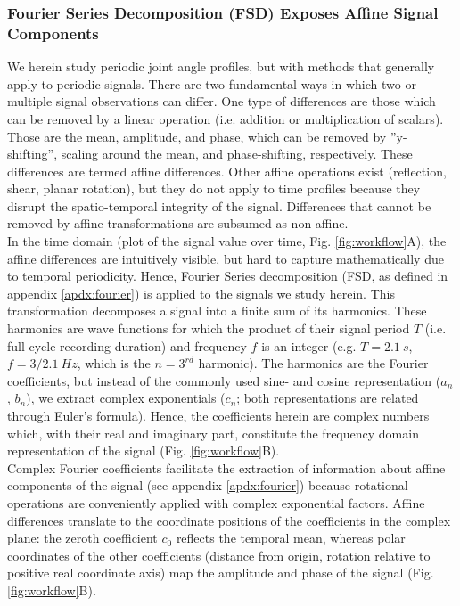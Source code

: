 \subsubsection{Fourier Series Decomposition (FSD) Exposes Affine Signal Components}
We herein study periodic joint angle profiles, but with methods that generally apply to periodic signals.
There are two fundamental ways in which two or multiple signal observations can differ.
One type of differences are those which can be removed by a linear operation (i.e. addition or multiplication of scalars).
Those are the mean, amplitude, and phase, which can be removed by ''y-shifting'', scaling around the mean, and phase-shifting, respectively.
These differences are termed affine differences.
Other affine operations exist (reflection, shear, planar rotation), but they do not apply to time profiles because they disrupt the spatio-temporal integrity of the signal.
Differences that cannot be removed by affine transformations are subsumed as non-affine.
\\In the time domain (plot of the signal value over time, Fig. \ref{fig:workflow}A), the affine differences are intuitively visible, but hard to capture mathematically due to temporal periodicity.
Hence, Fourier Series decomposition (FSD, as defined in appendix \ref*{apdx:fourier}) is applied to the signals we study herein.
This transformation decomposes a signal into a finite sum of its harmonics.
These harmonics are wave functions for which the product of their signal period $T$ (i.e. full cycle recording duration) and frequency $f$ is an integer (e.g. $T = 2.1\ s$, $f = 3/2.1\ Hz$, which is the $n=3^{rd}$ harmonic).
The harmonics are the Fourier coefficients, but instead of the commonly used sine- and cosine representation ($a_{n}$, $b_{n}$), we extract complex exponentials ($c_{n}$; both representations are related through Euler's formula).
Hence, the coefficients herein are complex numbers which, with their real and imaginary part, constitute the frequency domain representation of the signal (Fig. \ref{fig:workflow}B).
\\Complex Fourier coefficients facilitate the extraction of information about affine components of the signal (see appendix \ref*{apdx:fourier}) because rotational operations are conveniently applied with complex exponential factors.
Affine differences translate to the coordinate positions of the coefficients in the complex plane: the zeroth coefficient $c_{0}$ reflects the temporal mean, whereas polar coordinates of the other coefficients  (distance from origin, rotation relative to positive real coordinate axis) map the amplitude and phase of the signal (Fig. \ref{fig:workflow}B).
